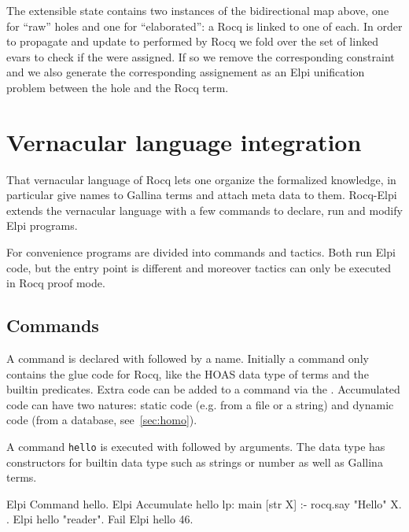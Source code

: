 \documentclass[a4paper, 11pt]{book}
\begin{document}
\noindent
The extensible state contains two instances of the bidirectional map above,
one for ``raw'' holes and one for ``elaborated'': a Rocq 
is linked to one of each.
In order to propagate and update to  performed by Rocq we 
fold over the set of linked evars to check if the were assigned. If so
we remove the corresponding  constraint and we also generate
the corresponding assignement as an Elpi unification problem between the
hole and the Rocq term.



\section{Vernacular language integration}

That vernacular language of Rocq lets one organize the formalized knowledge,
in particular give names to Gallina terms and attach meta data to them.
Rocq-Elpi extends the vernacular language with a few commands to declare, run
and modify Elpi programs.

For convenience programs are divided into commands and tactics. Both run
Elpi code, but the entry point is different and moreover tactics can only
be executed in Rocq proof mode.

\subsection{Commands}

A command is declared with  followed by a name.
Initially a command only contains the glue code for Rocq, like the
HOAS data type of terms and the builtin predicates. Extra code
can be added to a command via the .
Accumulated code can have two natures: static code (e.g. from a file
or a string) and dynamic code (from a database, see~\cref{sec:homo}).

A command \texttt{hello} is executed with  followed
by arguments. The  data type has constructors
for builtin data type such as strings or number as well as Gallina terms.

\begin{rocqcode}
Elpi Command hello.
Elpi Accumulate hello lp:{{
  main [str X] :- rocq.say "Hello" X.
}}.
Elpi hello "reader".
Fail Elpi hello 46.
\end{rocqcode}
\end{document}
